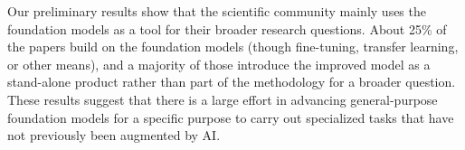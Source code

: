 \documentclass[acmsmall,authorversion]{acmart}
\begin{document}
Our preliminary results show that the scientific community mainly uses the foundation models as a tool for their broader research questions. About 25\% of the papers build on the foundation models (though fine-tuning, transfer learning, or other means), and a majority of those introduce the improved model as a stand-alone product rather than part of the methodology for a broader question. These results suggest that there is a large effort in advancing general-purpose foundation models for a specific purpose to carry out specialized tasks that have not previously been augmented by AI.



\end{document}
